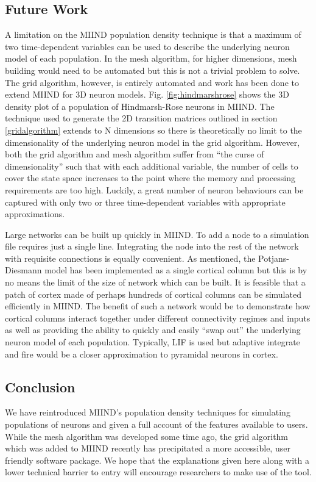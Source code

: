 \documentclass[utf8]{frontiersSCNS} %
\begin{document}
\subsection*{Future Work}
A limitation on the MIIND population density technique is that a maximum of two time-dependent variables can be used to describe the underlying neuron model of each population. In the mesh algorithm, for higher dimensions, mesh building would need to be automated but this is not a trivial problem to solve. The grid algorithm, however, is entirely automated and work has been done to extend MIIND for 3D neuron models. Fig. \ref{fig:hindmarshrose} shows the 3D density plot of a population of Hindmarsh-Rose neurons in MIIND. The technique used to generate the 2D transition matrices outlined in section \ref{gridalgorithm} extends to N dimensions so there is theoretically no limit to the dimensionality of the underlying neuron model in the grid algorithm. However, both the grid algorithm and mesh algorithm suffer from ``the curse of dimensionality'' such that with each additional variable, the number of cells to cover the state space increases to the point where the memory and processing requirements are too high. Luckily, a great number of neuron behaviours can be captured with only two or three time-dependent variables with appropriate approximations.

 Large networks can be built up quickly in MIIND. To add a node to a simulation file requires just a single line. Integrating the node into the rest of the network with requisite connections is equally convenient. As mentioned, the Potjans-Diesmann model has been implemented as a single cortical column but this is by no means the limit of the size of network which can be built. It is feasible that a patch of cortex made of perhaps hundreds of cortical columns can be simulated efficiently in MIIND. The benefit of such a network would be to demonstrate how cortical columns interact together under different connectivity regimes and inputs as well as providing the ability to quickly and easily ``swap out'' the underlying neuron model of each population. Typically, LIF is used but adaptive integrate and fire would be a closer approximation to pyramidal neurons in cortex.
 
 \subsection*{Conclusion}
 We have reintroduced MIIND's population density techniques for simulating populations of neurons and given a full account of the features available to users. While the mesh algorithm was developed some time ago, the grid algorithm which was added to MIIND recently has precipitated a more accessible, user friendly software package. We hope that the explanations given here along with a lower technical barrier to entry will encourage researchers to make use of the tool. 
\end{document}
